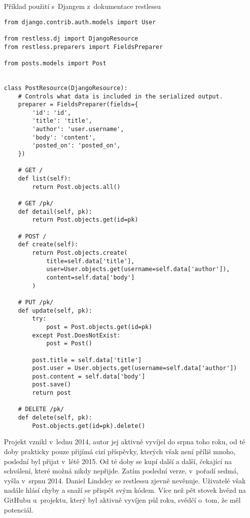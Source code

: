 \begin{listing}[htbp]
\caption{{\label{code:restless}Příklad použití s~Djangem z~dokumentace restlessu \autocite{restlessgh}}}
\begin{verbatim}
from django.contrib.auth.models import User

from restless.dj import DjangoResource
from restless.preparers import FieldsPreparer

from posts.models import Post


class PostResource(DjangoResource):
    # Controls what data is included in the serialized output.
    preparer = FieldsPreparer(fields={
        'id': 'id',
        'title': 'title',
        'author': 'user.username',
        'body': 'content',
        'posted_on': 'posted_on',
    })

    # GET /
    def list(self):
        return Post.objects.all()

    # GET /pk/
    def detail(self, pk):
        return Post.objects.get(id=pk)

    # POST /
    def create(self):
        return Post.objects.create(
            title=self.data['title'],
            user=User.objects.get(username=self.data['author']),
            content=self.data['body']
        )

    # PUT /pk/
    def update(self, pk):
        try:
            post = Post.objects.get(id=pk)
        except Post.DoesNotExist:
            post = Post()

        post.title = self.data['title']
        post.user = User.objects.get(username=self.data['author'])
        post.content = self.data['body']
        post.save()
        return post

    # DELETE /pk/
    def delete(self, pk):
        Post.objects.get(id=pk).delete()
\end{verbatim}
\end{listing}

Projekt vznikl v~lednu 2014, autor jej aktivně vyvíjel do srpna toho roku, od té doby prakticky pouze přijímá cizí příspěvky, kterých však není příliš mnoho, poslední byl přijat v~létě 2015. Od té doby se kupí další a další, čekající na schválení, které možná nikdy nepřijde. Zatím poslední verze, v~pořadí sedmá, vyšla v~srpnu 2014. Daniel Lindsley se restlessu zjevně nevěnuje. Uživatelé však nadále hlásí chyby a snaží se přispět svým kódem. Více než pět stovek hvězd na GitHubu u~projektu, který byl aktivně vyvíjen půl roku, svědčí o~tom, že měl potenciál.
